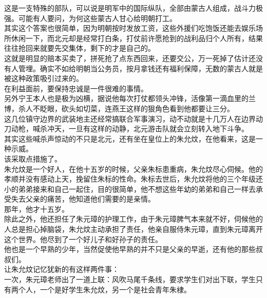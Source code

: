 \begin{multicols}{\theparacolNo}
这是一支特殊的部队，可以说是明军中的国际纵队，全部由蒙古人组成，战斗力极强。可能有人要问，为何这些蒙古人甘心给明朝打工。\\

其实这个答案也很简单，因为明朝按时发放工资，这些外援们吃饱饭还能去娱乐场所休闲一下，而北元却是经常打白条，打仗前许愿抢到的战利品归个人所有，结果往往抢回来就要先交集体，剩下的才是自己的。\\

这就是明显的赔本买卖了，拼死抢了点东西回来，还要交公，万一死掉了估计还没有人管埋。确实不如给明朝当公务员，按月拿钱还有福利保障，无数的蒙古人就是被这种政策吸引过来的。\\

在利益面前，要保持忠诚是一件很难的事情。\\

另外宁王本人也是极为凶横，据说他每次打仗都领头冲锋，活像第一滴血里的兰博，杀人不眨眼，砍头如切菜，连燕王这样的狠角色看到他都要让三分。\\

这几位镇守边界的武装地主还经常搞联合军事演习，动不动就是十几万人在边界动刀动枪，喊杀冲天，一旦有这样的动静，北元游击队就会立刻转入地下斗争。\\

其实这些喊杀声惊动的不只是北元，还有坐在皇位上的朱允炆，在他看来，这是一种示威。\\

该采取点措施了。\\

朱允炆是一个好人，在他十五岁的时候，父亲朱标患重病，朱允炆尽心伺候。他的孝顺并没有感动上天，挽留住朱标的性命。朱标去世后，朱允炆将他的三个年级还小的弟弟接来和自己一起住，目的很简单，他不想这些年幼的弟弟和自己一样去承受失去父亲的痛苦，他知道他们需要的是亲情。\\

那年，他才十五岁。\\

除此之外，他还担任了朱元璋的护理工作，由于朱元璋脾气本来就不好，伺候他的人总是担心掉脑袋，朱允炆主动承担了责任，他亲自服侍朱元璋，直到朱元璋离开这个世界。他尽到了一个好儿子和好孙子的责任。\\

他也是一个早熟的少年，当然促使他早熟的并不只是父亲的早逝，还有他的那些叔叔们。\\

让朱允炆记忆犹新的有这样两件事：\\

一次，朱元璋老师出了一道上联：风吹马尾千条线，要求学生们对出下联，学生只有两个人，一个是好学生朱允炆，另一个是社会青年朱棣。\\


\end{multicols}
